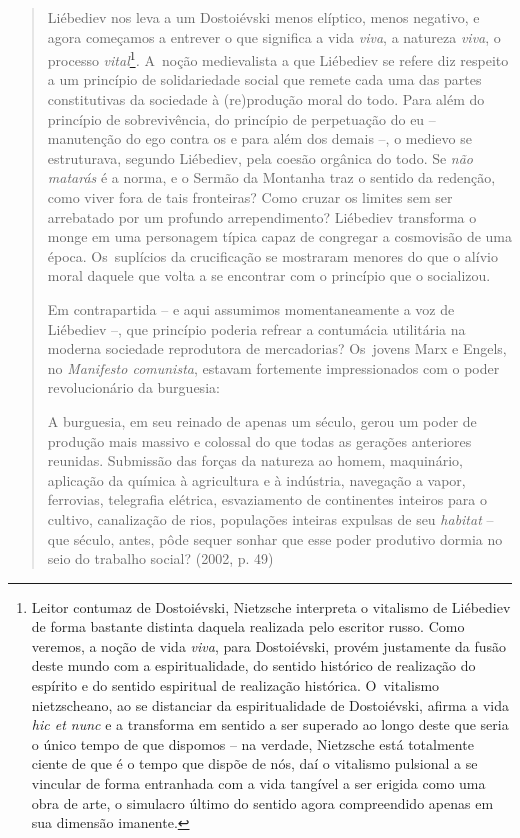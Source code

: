 {\begin{quote}
Liébediev nos leva a um Dostoiévski menos elíptico, menos negativo, e
agora começamos a entrever o que significa a vida \emph{viva}, a
natureza \emph{viva}, o processo \emph{vital}\footnote{Leitor contumaz
  de Dostoiévski, Nietzsche interpreta o vitalismo de Liébediev de forma
  bastante distinta daquela realizada pelo escritor russo. Como veremos,
  a noção de vida \emph{viva}, para Dostoiévski, provém justamente da
  fusão deste mundo com a espiritualidade, do sentido histórico de
  realização do espírito e do sentido espiritual de realização
  histórica. O~vitalismo nietzscheano, ao se distanciar da
  espiritualidade de Dostoiévski, afirma a vida \emph{hic et nunc} e a
  transforma em sentido a ser superado ao longo deste que seria o único
  tempo de que dispomos -- na verdade, Nietzsche está totalmente ciente
  de que é o tempo que dispõe de nós, daí o vitalismo pulsional a se
  vincular de forma entranhada com a vida tangível a ser erigida como
  uma obra de arte, o simulacro último do sentido agora compreendido
  apenas em sua dimensão imanente.}\emph{.} A~noção medievalista a que
Liébediev se refere diz respeito a um princípio de solidariedade social
que remete cada uma das partes constitutivas da sociedade à (re)produção
moral do todo. Para além do princípio de sobrevivência, do princípio de
perpetuação do eu -- manutenção do ego contra os e para além dos demais
--, o medievo se estruturava, segundo Liébediev, pela coesão orgânica do
todo. Se \emph{não matarás} é a norma, e o Sermão da Montanha traz o
sentido da redenção, como viver fora de tais fronteiras? Como cruzar os
limites sem ser arrebatado por um profundo arrependimento? Liébediev
transforma o monge em uma personagem típica capaz de congregar a
cosmovisão de uma época. Os~suplícios da crucificação se mostraram
menores do que o alívio moral daquele que volta a se encontrar com o
princípio que o socializou.

Em contrapartida -- e aqui assumimos momentaneamente a voz de Liébediev
--, que princípio poderia refrear a contumácia utilitária na moderna
sociedade reprodutora de mercadorias? Os~jovens Marx e Engels, no
\emph{Manifesto comunista}, estavam fortemente impressionados com o
poder revolucionário da burguesia:

A burguesia, em seu reinado de apenas um século, gerou um poder de
produção mais massivo e colossal do que todas as gerações anteriores
reunidas. Submissão das forças da natureza ao homem, maquinário,
aplicação da química à agricultura e à indústria, navegação a vapor,
ferrovias, telegrafia elétrica, esvaziamento de continentes inteiros
para o cultivo, canalização de rios, populações inteiras expulsas de seu
\emph{habitat} -- que século, antes, pôde sequer sonhar que esse poder
produtivo dormia no seio do trabalho social? (2002, p. 49)


\end{quote}}

